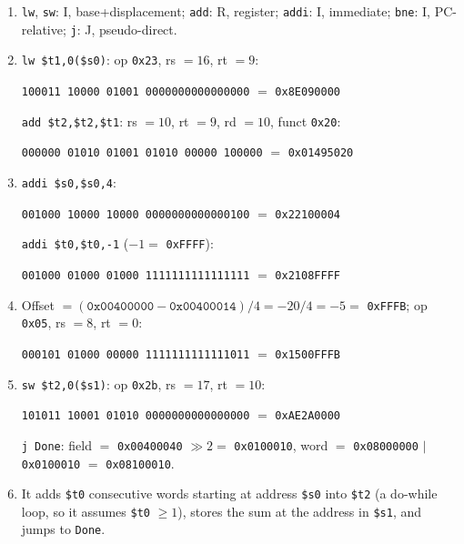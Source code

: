 \documentclass[11pt]{article}
\newcommand{\enc}[2]{\par{\centering\texttt{#1} $=$ \texttt{#2}\par}}
\begin{document}
\begin{solution}[\ref{x:loop}]
\leavevmode
\begin{enumerate}[label=(\alph*),leftmargin=*]
  \item \texttt{lw}, \texttt{sw}: I, base+displacement; \texttt{add}: R,
  register; \texttt{addi}: I, immediate; \texttt{bne}: I, PC-relative;
  \texttt{j}: J, pseudo-direct.
  \item \texttt{lw \$t1,0(\$s0)}: op \texttt{0x23}, rs $=16$, rt $=9$:
  \enc{100011 10000 01001 0000000000000000}{0x8E090000}
  \texttt{add \$t2,\$t2,\$t1}: rs $=10$, rt $=9$, rd $=10$, funct
  \texttt{0x20}:
  \enc{000000 01010 01001 01010 00000 100000}{0x01495020}
  \item \texttt{addi \$s0,\$s0,4}:
  \enc{001000 10000 10000 0000000000000100}{0x22100004}
  \texttt{addi \$t0,\$t0,-1} ($-1 = $ \texttt{0xFFFF}):
  \enc{001000 01000 01000 1111111111111111}{0x2108FFFF}
  \item Offset $= (\texttt{0x00400000} - \texttt{0x00400014})/4 = -20/4 =
  -5 = $ \texttt{0xFFFB}; op \texttt{0x05}, rs $=8$, rt $=0$:
  \enc{000101 01000 00000 1111111111111011}{0x1500FFFB}
  \item \texttt{sw \$t2,0(\$s1)}: op \texttt{0x2b}, rs $=17$, rt $=10$:
  \enc{101011 10001 01010 0000000000000000}{0xAE2A0000}
  \texttt{j Done}: field $=$ \texttt{0x00400040} $\gg 2 =$
  \texttt{0x0100010}, word $=$ \texttt{0x08000000} $|$ \texttt{0x0100010}
  $=$ \texttt{0x08100010}.
  \item It adds \texttt{\$t0} consecutive words starting at address
  \texttt{\$s0} into \texttt{\$t2} (a do-while loop, so it assumes
  \texttt{\$t0} $\ge 1$), stores the sum at the address in \texttt{\$s1},
  and jumps to \texttt{Done}.
\end{enumerate}
\end{solution}
\end{document}
